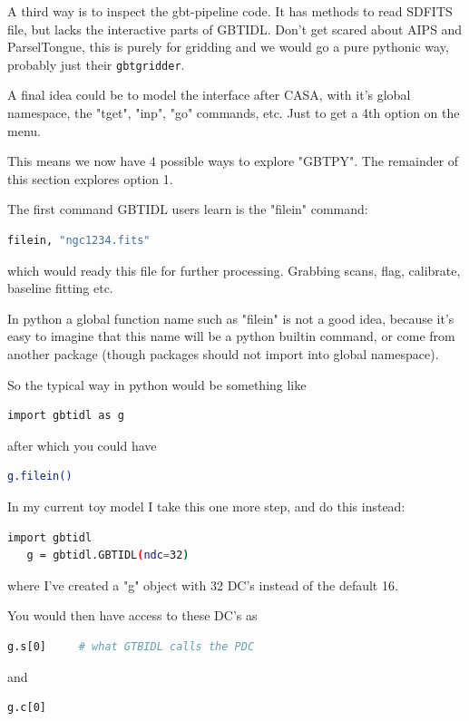 \documentclass[12pt,a4paper]{article}
\begin{document}
A third way is to inspect the gbt-pipeline code. It has methods to
read SDFITS file, but lacks the interactive parts of GBTIDL.  Don't
get scared about AIPS and ParselTongue, this is purely for gridding and
we would go a pure pythonic way, probably just their {\tt gbtgridder}.


A final idea could be to model the interface after CASA, with it's
global namespace, the "tget", "inp", "go" commands, etc. Just to get
a 4th option on the menu. 


This means we now have 4 possible ways to explore "GBTPY". The remainder
of this section explores option 1.



The first command GBTIDL users learn is the "filein" command:

\begin{lstlisting}[language=bash]
    filein, "ngc1234.fits"
\end{lstlisting}

which would ready this file for further processing. Grabbing scans,
flag, calibrate, baseline fitting etc.


In python a global function name such as "filein" is not a good idea,
because it's easy to imagine that this name will be a python builtin
command, or come from another package (though packages should not
import into global namespace).

So the typical way in python would be something like

\begin{lstlisting}[language=bash]
   import gbtidl as g
\end{lstlisting}

after which you could have

\begin{lstlisting}[language=bash]
   g.filein()
\end{lstlisting}

In my current toy model I take this one more step, and do this instead:

\begin{lstlisting}[language=bash]
   import gbtidl
   g = gbtidl.GBTIDL(ndc=32)
\end{lstlisting}

where I've created a "g" object with 32 DC's instead of the default 16.

You would then have access to these DC's as
\begin{lstlisting}[language=bash]
   g.s[0]     # what GTBIDL calls the PDC
\end{lstlisting}
and
\begin{lstlisting}[language=bash]
   g.c[0]
\end{lstlisting}
   
\end{document}
